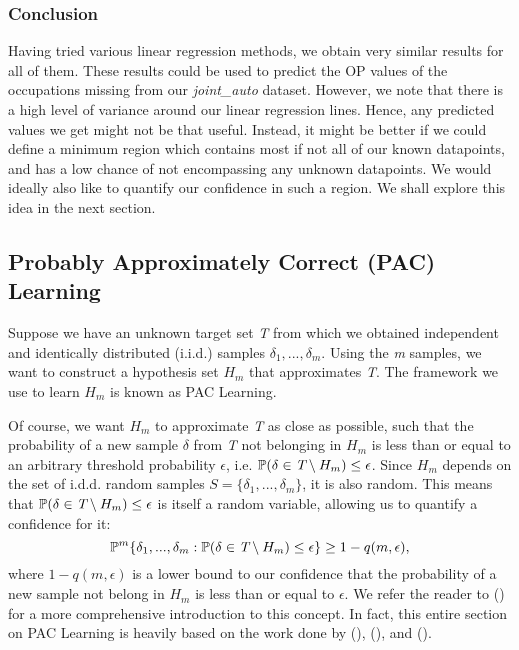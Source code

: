 \documentclass[11pt]{article}
\begin{document}
\subsubsection*{Conclusion}
Having tried various linear regression methods, we obtain very similar results for all of them. These results could be used to predict the OP values of the occupations missing from our \emph{joint\_auto} dataset. However, we note that there is a high level of variance around our linear regression lines. Hence, any predicted values we get might not be that useful. Instead, it might be better if we could define a minimum region which contains most if not all of our known datapoints, and has a low chance of not encompassing any unknown datapoints. We would ideally also like to quantify our confidence in such a region. We shall explore this idea in the next section.


\subsection{Probably Approximately Correct (PAC) Learning}
Suppose we have an unknown target set \emph{T} from which we obtained independent and identically distributed (i.i.d.) samples $\delta_{1},...,\delta_{m}$. Using the \emph{m} samples, we want to construct a hypothesis set $H_{m}$ that approximates \emph{T}. The framework we use to learn $H_{m}$ is known as PAC Learning.

Of course, we want $H_{m}$ to approximate \emph{T} as close as possible, such that the probability of a new sample $\delta$ from \emph{T} not belonging in $H_{m}$ is less than or equal to an arbitrary threshold probability $\epsilon$, i.e. $\mathbb{P}(\delta \in \emph{T} \setminus H_{m}) \leq \epsilon$. Since $H_{m}$ depends on the set of i.d.d. random samples $S = \{\delta_{1},...,\delta_{m}\}$, it is also random. This means that $\mathbb{P}(\delta \in \emph{T} \setminus H_{m}) \leq \epsilon$ is itself a random variable, allowing us to quantify a confidence for it:
\begin{equation}
	\label{eq:1}
	\mathbb{P}^{m} \{\delta_{1},...,\delta_{m}: \mathbb{P}(\delta \in \emph{T} \setminus H_{m}) \leq \epsilon \} \geq 1 - q(m,\epsilon),
\end{equation}
where $1 - q(m,\epsilon)$ is a lower bound to our confidence that the probability of a new sample not belong in $H_{m}$ is less than or equal to $\epsilon$. We refer the reader to (\cite{paclearning1}) for a more comprehensive introduction to this concept. In fact, this entire section on PAC Learning is heavily based on the work done by (\cite{paclearning1}), (\cite{romao2021tight}), and (\cite{9750913}).
\end{document}
